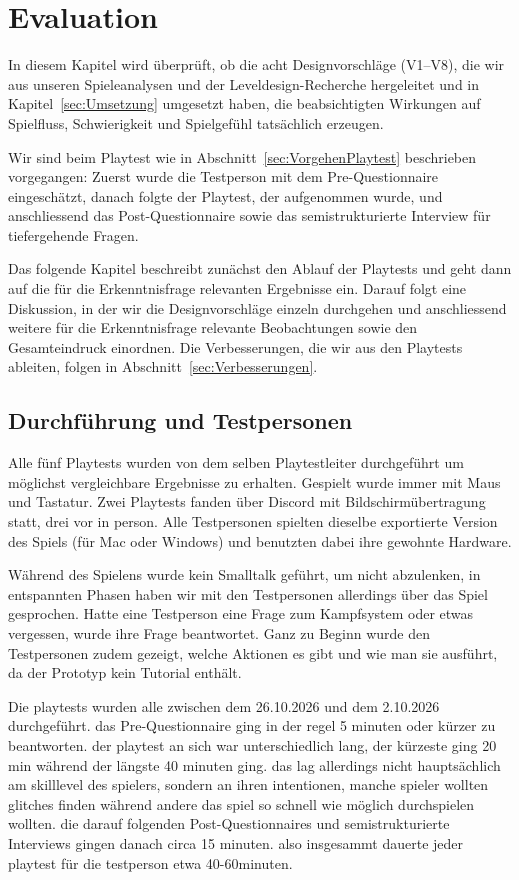 \documentclass[../Main.tex]{subfiles}
\begin{document}
\section{Evaluation} \label{sec:Evaluation}

In diesem Kapitel wird überprüft, ob die acht Designvorschläge (V1--V8), die wir aus unseren Spieleanalysen und der Leveldesign-Recherche hergeleitet und in Kapitel~\ref{sec:Umsetzung} umgesetzt haben, die beabsichtigten Wirkungen auf Spielfluss, Schwierigkeit und Spielgefühl tatsächlich erzeugen.

Wir sind beim Playtest wie in Abschnitt~\ref{sec:VorgehenPlaytest} beschrieben vorgegangen: Zuerst wurde die Testperson mit dem Pre-Questionnaire eingeschätzt, danach folgte der Playtest, der aufgenommen wurde, und anschliessend das Post-Questionnaire sowie das semistrukturierte Interview für tiefergehende Fragen.

Das folgende Kapitel beschreibt zunächst den Ablauf der Playtests und geht dann auf die für die Erkenntnisfrage relevanten Ergebnisse ein. Darauf folgt eine Diskussion, in der wir die Designvorschläge einzeln durchgehen und anschliessend weitere für die Erkenntnisfrage relevante Beobachtungen sowie den Gesamteindruck einordnen. Die Verbesserungen, die wir aus den Playtests ableiten, folgen in Abschnitt~\ref{sec:Verbesserungen}.

\subsection{Durchführung und Testpersonen} \label{sec:Durchfuehrung}

Alle fünf Playtests wurden von dem selben Playtestleiter durchgeführt um möglichst vergleichbare Ergebnisse zu erhalten. Gespielt wurde immer mit Maus und Tastatur. Zwei Playtests fanden über Discord mit Bildschirmübertragung statt, drei vor in person. Alle Testpersonen spielten dieselbe exportierte Version des Spiels (für Mac oder Windows) und benutzten dabei ihre gewohnte Hardware.

Während des Spielens wurde kein Smalltalk geführt, um nicht abzulenken, in entspannten Phasen haben wir mit den Testpersonen allerdings über das Spiel gesprochen. Hatte eine Testperson eine Frage zum Kampfsystem oder etwas vergessen, wurde ihre Frage beantwortet. Ganz zu Beginn wurde den Testpersonen zudem gezeigt, welche Aktionen es gibt und wie man sie ausführt, da der Prototyp kein Tutorial enthält.

Die playtests wurden alle zwischen dem 26.10.2026 und dem 2.10.2026 durchgeführt. das Pre-Questionnaire ging in der regel 5 minuten oder kürzer zu beantworten. der playtest an sich war unterschiedlich lang, der kürzeste ging 20 min während der längste 40 minuten ging. das lag allerdings nicht hauptsächlich am skilllevel des spielers, sondern an ihren intentionen, manche spieler wollten glitches finden während andere das spiel so schnell wie möglich durchspielen wollten. die darauf folgenden Post-Questionnaires und semistrukturierte Interviews gingen danach circa 15 minuten. also insgesammt dauerte jeder playtest für die testperson etwa 40-60minuten.
\end{document}
